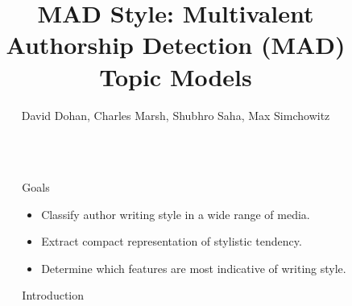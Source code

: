 \documentclass[final]{beamer}
\title{MAD Style: Multivalent Authorship Detection (MAD) Topic Models} %
\author{David Dohan, Charles Marsh, Shubhro Saha, Max Simchowitz} %
\institute{Princeton University, Department of Computer Science} %
\newlength{\sepwid}
\newlength{\onecolwid}
\begin{document}

\setlength{\belowcaptionskip}{2ex} %
\setlength\belowdisplayshortskip{2ex} %

\begin{frame}[t]  %

\begin{columns}[t] %

\begin{column}{\sepwid}\end{column} %

\begin{column}{\onecolwid} %


\begin{alertblock}{Goals}
\begin{itemize}
\item Classify author writing style in a wide range of media.
\item Extract compact representation of stylistic tendency.
\item Determine which features are most indicative of writing style.
\end{itemize}
\end{alertblock}


\begin{block}{Introduction}


\end{block}
\end{column}
\end{columns}
\end{frame}
\end{document}
